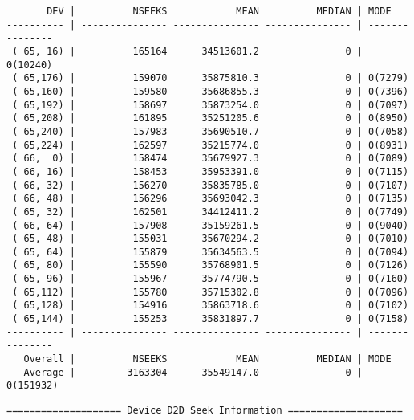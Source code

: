 \begin{verbatim}
       DEV |          NSEEKS            MEAN          MEDIAN | MODE           
---------- | --------------- --------------- --------------- | ---------------
 ( 65, 16) |          165164      34513601.2               0 | 0(10240)
 ( 65,176) |          159070      35875810.3               0 | 0(7279)
 ( 65,160) |          159580      35686855.3               0 | 0(7396)
 ( 65,192) |          158697      35873254.0               0 | 0(7097)
 ( 65,208) |          161895      35251205.6               0 | 0(8950)
 ( 65,240) |          157983      35690510.7               0 | 0(7058)
 ( 65,224) |          162597      35215774.0               0 | 0(8931)
 ( 66,  0) |          158474      35679927.3               0 | 0(7089)
 ( 66, 16) |          158453      35953391.0               0 | 0(7115)
 ( 66, 32) |          156270      35835785.0               0 | 0(7107)
 ( 66, 48) |          156296      35693042.3               0 | 0(7135)
 ( 65, 32) |          162501      34412411.2               0 | 0(7749)
 ( 66, 64) |          157908      35159261.5               0 | 0(9040)
 ( 65, 48) |          155031      35670294.2               0 | 0(7010)
 ( 65, 64) |          155879      35634563.5               0 | 0(7094)
 ( 65, 80) |          155590      35768901.5               0 | 0(7126)
 ( 65, 96) |          155967      35774790.5               0 | 0(7160)
 ( 65,112) |          155780      35715302.8               0 | 0(7096)
 ( 65,128) |          154916      35863718.6               0 | 0(7102)
 ( 65,144) |          155253      35831897.7               0 | 0(7158)
---------- | --------------- --------------- --------------- | ---------------
   Overall |          NSEEKS            MEAN          MEDIAN | MODE           
   Average |         3163304      35549147.0               0 | 0(151932)
\end{verbatim}\newpage\begin{verbatim}
==================== Device D2D Seek Information ====================


\end{verbatim}

